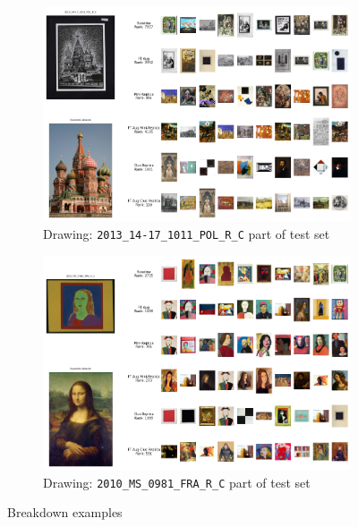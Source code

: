 {\begin{landscape}
\begin{figure}
\begin{subfigure}[b]{0.55\textwidth}
         \label{fig:2000_14-17_0443_UKR_R_C}
     \end{subfigure}
     \hfil
     \begin{subfigure}[b]{0.55\textwidth}
         \centering
         \includegraphics[width=1.01\textwidth]{images/qualitative_analysis/2013_14-17_1011_POL_R_C.png}
         \caption{Drawing: \texttt{2013\_14-17\_1011\_POL\_R\_C} part of test set}
         \label{fig:2013_14-17_1011_POL_R_C}
     \end{subfigure}
     \hfil
     \begin{subfigure}[b]{0.55\textwidth}
         \centering
         \includegraphics[width=1.01\textwidth]{images/qualitative_analysis/2010_MS_0981_FRA_R_C.png}
         \caption{Drawing: \texttt{2010\_MS\_0981\_FRA\_R\_C} part of test set}
         \label{fig:2010_MS_0981_FRA_R_C}
     \end{subfigure}
        \caption{Breakdown examples}
        \label{fig:breakdown}
\end{figure}

    \end{landscape}
    \clearpage
}

